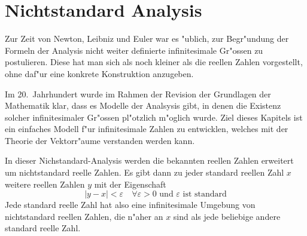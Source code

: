 %
%
%
\chapter{Nichtstandard Analysis}
Zur Zeit von Newton, Leibniz und Euler war es "ublich, zur Begr"undung der
Formeln der Analysis nicht weiter definierte infinitesimale Gr"ossen
zu postulieren.
Diese hat man sich als noch kleiner als die reellen Zahlen vorgestellt,
ohne daf"ur eine konkrete Konstruktion anzugeben.

Im 20.~Jahrhundert wurde im Rahmen der Revision der Grundlagen der Mathematik
klar, dass es Modelle der Analsysis gibt, in denen die Existenz solcher
infinitesimaler Gr"ossen pl"otzlich m"oglich wurde.
Ziel dieses Kapitels ist ein einfaches Modell f"ur infinitesimale 
Zahlen zu entwicklen, welches mit der Theorie der Vektorr"aume
verstanden werden kann.

In dieser Nichstandard-Analysis werden die bekannten reellen Zahlen
erweitert um nichtstandard reelle Zahlen.
Es gibt dann zu jeder standard reellen Zahl $x$ weitere reellen Zahlen $y$ 
mit der Eigenschaft
\[
|y - x| < \varepsilon\quad\forall \varepsilon > 0 \text{ und $\varepsilon$ ist standard}
\]
Jede standard reelle Zahl hat also eine infinitesimale Umgebung von 
nichtstandard reellen Zahlen, die n"aher an $x$ sind als jede beliebige
andere standard reelle Zahl.







